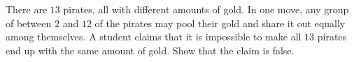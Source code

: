 There are $13$ pirates, all with different amounts of gold. In one move, any group of between $2$ and $12$ of the pirates may pool their gold and share it out equally among themselves. A student claims that it is impossible to make all $13$ pirates end up with the same amount of gold. Show that the claim is false.
